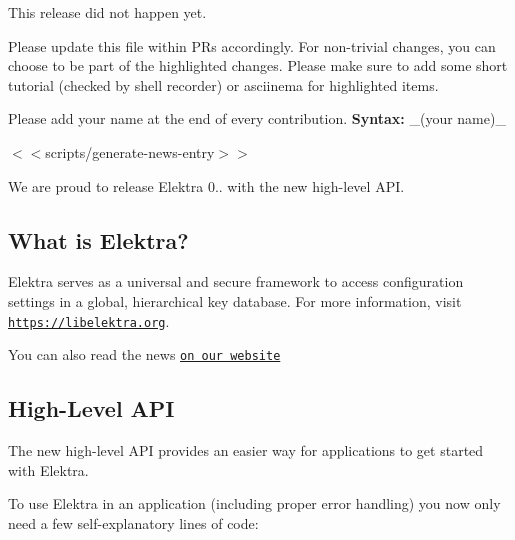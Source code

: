 This release did not happen yet.

Please update this file within P\+Rs accordingly. For non-\/trivial changes, you can choose to be part of the highlighted changes. Please make sure to add some short tutorial (checked by shell recorder) or asciinema for highlighted items.

Please add your name at the end of every contribution. {\bfseries Syntax\+:} \+\_\+(your name)\+\_\+

$<$$<${\ttfamily scripts/generate-\/news-\/entry}$>$$>$

We are proud to release Elektra 0.. with the new high-\/level A\+PI.

\subsection*{What is Elektra?}

Elektra serves as a universal and secure framework to access configuration settings in a global, hierarchical key database. For more information, visit \href{https://libelektra.org}{\tt https\+://libelektra.\+org}.

You can also read the news \href{https://www.libelektra.org/news/0.8.26-release}{\tt on our website}

\subsection*{High-\/\+Level A\+PI}

The new high-\/level A\+PI provides an easier way for applications to get started with Elektra.

To use Elektra in an application (including proper error handling) you now only need a few self-\/explanatory lines of code\+:


